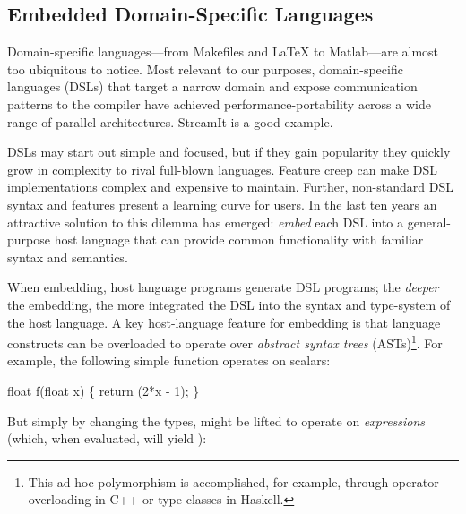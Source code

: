\subsection{Embedded Domain-Specific Languages}


Domain-specific languages---from Makefiles and \LaTeX{} to
Matlab---are almost too ubiquitous to notice.  Most relevant to our
purposes, domain-specific languages (DSLs) that target a narrow domain and expose communication
patterns to the compiler 
 have achieved performance-portability across a wide range of parallel
architectures.  
StreamIt\cite{streamit} is a good example.
% 

DSLs may start out simple and focused, but if they gain popularity
they quickly grow in complexity to rival full-blown languages.
Feature creep
can make DSL implementations complex and expensive to maintain.
Further, non-standard DSL syntax and features present a learning curve for users.  In the
last ten years an attractive solution to this dilemma has emerged: {\em
  embed} each DSL into a general-purpose host language that can provide
common functionality with familiar syntax and semantics.

When embedding, host language programs {generate} DSL programs;
the {\em deeper} the embedding, the more integrated the
DSL into the syntax and type-system of the host language.
%
A key host-language feature for embedding is that
language constructs can be overloaded to operate over {\em abstract
  syntax trees} (ASTs)\footnote{This ad-hoc polymorphism is accomplished,
for example, through operator-overloading in C++ or type classes in
Haskell.}.  For example, the following simple function operates on scalars:

\vspace{1mm}
\begin{code}
  float f(float x) \{ return (2*x - 1); \}
\end{code}
\noindent
But simply by changing the types,  might be lifted to operate on {\em
  expressions} (which, when evaluated, will yield ):

